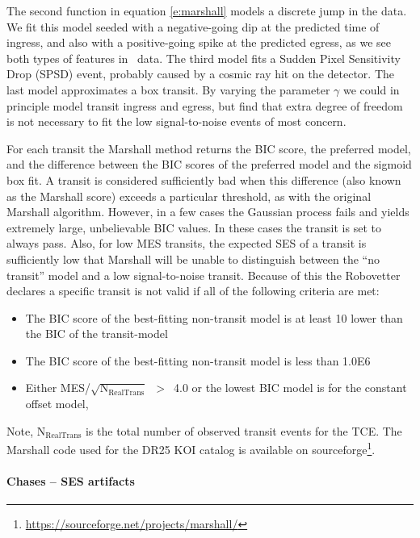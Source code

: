 The second function in equation \ref{e:marshall} models a discrete jump in the data. We fit this model seeded with a negative-going dip at the predicted time of ingress, and also with a positive-going spike at the predicted egress, as we see both types of features in \Kepler\ data. The third model fits a Sudden Pixel Sensitivity Drop (SPSD) event, probably caused by a cosmic ray hit on the detector. The last model approximates a box transit. By varying the parameter $\gamma$ we could in principle model transit ingress and egress, but find that extra degree of freedom is not necessary to fit the low signal-to-noise events of most concern.

For each transit the Marshall method returns the BIC score, the preferred model, and the difference between the BIC scores of the preferred model and the sigmoid box fit.  A transit is considered sufficiently bad when this difference (also known as the Marshall score) exceeds a particular threshold, as with the original Marshall algorithm.  However, in a few cases the Gaussian process fails and yields extremely large, unbelievable BIC values. In these cases the transit is set to always pass.  Also, for low MES transits, the expected SES of a transit is sufficiently low that Marshall will be unable to distinguish between the ``no transit'' model and a low signal-to-noise transit.  Because of this the Robovetter declares a specific transit is not valid if all of the following criteria are met:

\begin{itemize}
\item The BIC score of the best-fitting non-transit model is at least 10 lower than the BIC of the transit-model
\item The BIC score of the best-fitting non-transit model is less than 1.0E6
\item Either MES/$\sqrt{\textrm{N}_{\textrm{RealTrans}}}$~$>$~4.0 or the lowest BIC model is for the constant offset model, 
\end{itemize}

Note, N$_{\textrm{RealTrans}}$ is the total number of observed transit events for the TCE. The Marshall code used for the DR25 KOI catalog is available on sourceforge\footnote{ \url{https://sourceforge.net/projects/marshall/}}.


\paragraph{Chases -- SES artifacts}
\label{s:chases}

